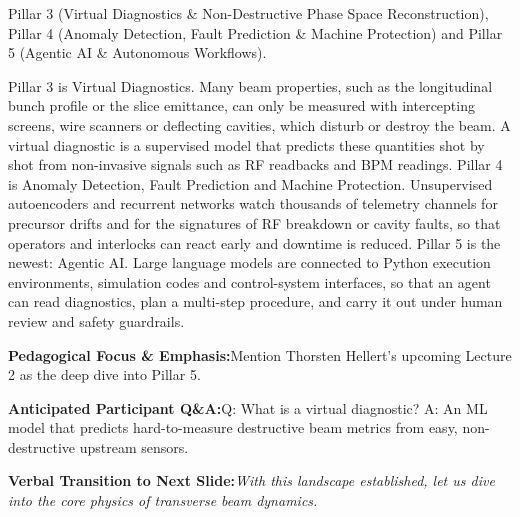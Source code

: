 \documentclass[11pt,a4paper]{article}
\begin{document}
\vspace{0.2em}
\begin{tcolorbox}[colback=lightbg,colframe=bordergray,title={\footnotesize\bfseries\color{darkgray}Slide Visual Blueprint},fontupper=\small,left=6pt,right=6pt,top=2.5pt,bottom=2.5pt,boxrule=0.6pt,arc=2.5pt]
Pillar 3 (Virtual Diagnostics \& Non-Destructive Phase Space Reconstruction), Pillar 4 (Anomaly Detection, Fault Prediction \& Machine Protection) and Pillar 5 (Agentic AI \& Autonomous Workflows).
\end{tcolorbox}
\vspace{0.2em}
\begin{tcolorbox}[colback=white,colframe=primaryblue,title={\footnotesize\bfseries\color{white}Spoken Presenter Script},fontupper=\small,left=6pt,right=6pt,top=3pt,bottom=3pt,boxrule=0.8pt,arc=2.5pt]
Pillar 3 is Virtual Diagnostics. Many beam properties, such as the longitudinal bunch profile or the slice emittance, can only be measured with intercepting screens, wire scanners or deflecting cavities, which disturb or destroy the beam. A virtual diagnostic is a supervised model that predicts these quantities shot by shot from non-invasive signals such as RF readbacks and BPM readings. Pillar 4 is Anomaly Detection, Fault Prediction and Machine Protection. Unsupervised autoencoders and recurrent networks watch thousands of telemetry channels for precursor drifts and for the signatures of RF breakdown or cavity faults, so that operators and interlocks can react early and downtime is reduced. Pillar 5 is the newest: Agentic AI. Large language models are connected to Python execution environments, simulation codes and control-system interfaces, so that an agent can read diagnostics, plan a multi-step procedure, and carry it out under human review and safety guardrails.
\end{tcolorbox}
\vspace{0.2em}
\begin{tcolorbox}[colback=lightbg,colframe=bordergray,left=6pt,right=6pt,top=3pt,bottom=3pt,boxrule=0.6pt,arc=2.5pt]
\small
\noindent\textbf{\color{navy}Pedagogical Focus \& Emphasis:}\enspace Mention Thorsten Hellert's upcoming Lecture 2 as the deep dive into Pillar 5.\par\vspace{0.3em}
\noindent\textbf{\color{successgreen}Anticipated Participant Q\&A:}\enspace Q: What is a virtual diagnostic? A: An ML model that predicts hard-to-measure destructive beam metrics from easy, non-destructive upstream sensors.\par\vspace{0.3em}
\noindent\textbf{\color{accent}Verbal Transition to Next Slide:}\enspace \emph{With this landscape established, let us dive into the core physics of transverse beam dynamics.}
\end{tcolorbox}
\end{document}
